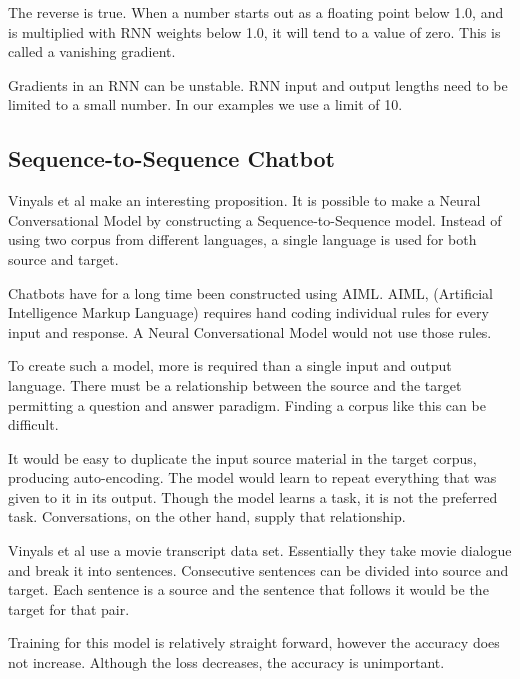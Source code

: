 
The reverse is true. When a number starts out as a floating point below 1.0, and is multiplied with RNN weights below 1.0, it will tend to a value of zero. This is called a vanishing gradient.


Gradients in an RNN can be unstable. RNN input and output lengths need to be limited to a small number. In our examples we use a limit of 10.

\subsection{Sequence-to-Sequence Chatbot}

Vinyals et al \cite{DBLP:journals/corr/VinyalsL15} make an interesting proposition. It is possible to make a Neural Conversational Model by constructing a Sequence-to-Sequence model. Instead of using two corpus from different languages, a single language is used for both source and target.

Chatbots have for a long time been constructed using \ac{AIML}. AIML, (Artificial Intelligence Markup Language) requires hand coding individual rules for every input and response. A Neural Conversational Model would not use those rules.

To create such a model, more is required than a single input and output language. There must be a relationship between the source and the target permitting a question and answer paradigm. Finding a corpus like this can be difficult.

It would be easy to duplicate the input source material in the target corpus, producing auto-encoding. The model would learn to repeat everything that was given to it in its output. Though the model learns a task, it is not the preferred task. Conversations, on the other hand, supply that relationship. 

Vinyals et al \cite{DBLP:journals/corr/VinyalsL15} use a movie transcript data set. Essentially they take movie dialogue and break it into sentences. Consecutive sentences can be divided into source and target. Each sentence is a source and the sentence that follows it would be the target for that pair. 

Training for this model is relatively straight forward, however the accuracy does not increase. Although the loss decreases, the accuracy is unimportant. %

